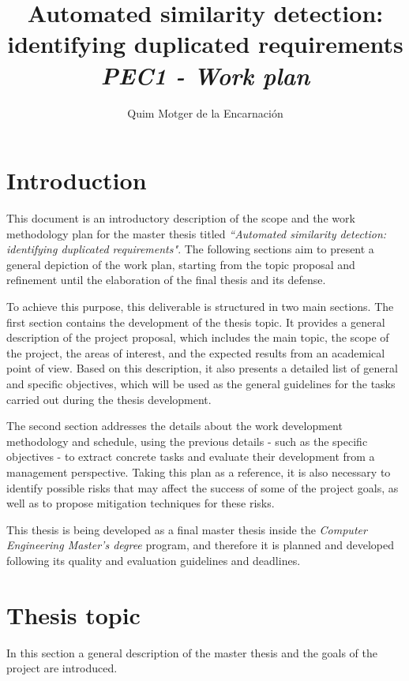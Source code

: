 \documentclass[11pt]{article}
\title{Automated similarity detection:\\ identifying duplicated requirements\\\textit{PEC1 - Work plan}}
\author{
%
Quim Motger de la Encarnación
\institution{Universitat Oberta de Catalunya\\Universitat Politecnica de Catalunya}
}
\begin{document}
\maketitle

\section{Introduction}
\label{sec:introduction}

This document is an introductory description of the scope and the work methodology plan for the master thesis titled \textit{``Automated similarity detection: identifying duplicated requirements"}. The following sections aim to present a general depiction of the work plan, starting from the topic proposal and refinement until the elaboration of the final thesis and its defense.

To achieve this purpose, this deliverable is structured in two main sections. The first section contains the development of the thesis topic. It provides a general description of the project proposal, which includes the main topic, the scope of the project, the areas of interest, and the expected results from an academical point of view. Based on this description, it also presents a detailed list of general and specific objectives, which will be used as the general guidelines for the tasks carried out during the thesis development.

The second section addresses the details about the work development methodology and schedule, using the previous details - such as the specific objectives - to extract concrete tasks and evaluate their development from a management perspective. Taking this plan as a reference, it is also necessary to identify possible risks that may affect the success of some of the project goals, as well as to propose mitigation techniques for these risks.

This thesis is being developed as a final master thesis inside the \textit{Computer Engineering Master's degree} program, and therefore it is planned and developed following its quality and evaluation guidelines and deadlines.

\section{Thesis topic}
\label{sec:topic_description}

In this section a general description of the master thesis and the goals of the project are introduced.
\end{document}

